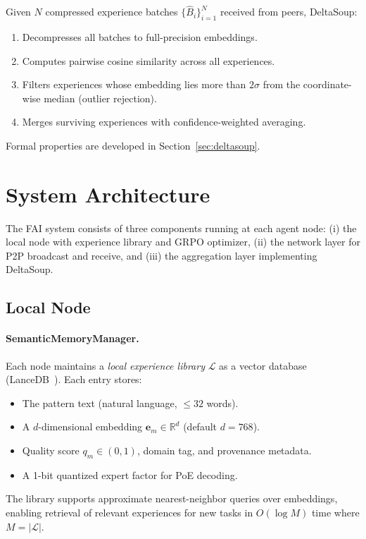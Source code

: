 \documentclass[11pt]{article}
\begin{document}
Given $N$ compressed experience batches $\{\hat{B}_i\}_{i=1}^N$ received from
peers, DeltaSoup:
\begin{enumerate}[leftmargin=1.5em]
    \item Decompresses all batches to full-precision embeddings.
    \item Computes pairwise cosine similarity across all experiences.
    \item Filters experiences whose embedding lies more than $2\sigma$ from
          the coordinate-wise median (outlier rejection).
    \item Merges surviving experiences with confidence-weighted averaging.
\end{enumerate}

Formal properties are developed in Section~\ref{sec:deltasoup}.

\section{System Architecture}
\label{sec:architecture}

The FAI system consists of three components running at each agent node:
(i) the local node with experience library and GRPO optimizer,
(ii) the network layer for P2P broadcast and receive, and
(iii) the aggregation layer implementing DeltaSoup.

\subsection{Local Node}

\paragraph{SemanticMemoryManager.}
Each node maintains a \emph{local experience library} $\mathcal{L}$ as a
vector database (LanceDB~\cite{lancedb2024}). Each entry stores:
\begin{itemize}[leftmargin=1.5em]
    \item The pattern text (natural language, $\leq 32$ words).
    \item A $d$-dimensional embedding $\bm{e}_m \in \mathbb{R}^d$ (default $d = 768$).
    \item Quality score $q_m \in (0,1)$, domain tag, and provenance metadata.
    \item A 1-bit quantized expert factor for PoE decoding.
\end{itemize}
The library supports approximate nearest-neighbor queries over embeddings,
enabling retrieval of relevant experiences for new tasks in $O(\log M)$ time
where $M = |\mathcal{L}|$.
\end{document}
